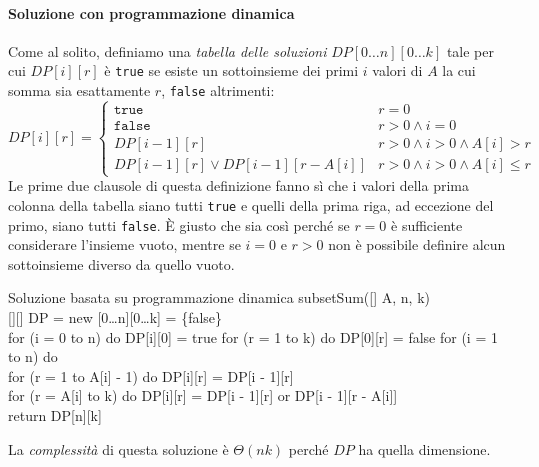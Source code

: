 \paragraph{Soluzione con programmazione dinamica}
Come al solito, definiamo una \emph{tabella delle soluzioni}
$DP[0\dots n][0\dots k]$ tale per cui $DP[i][r]$ è \texttt{true} se esiste un
sottoinsieme dei primi $i$ valori di $A$ la cui somma sia esattamente $r$,
\texttt{false} altrimenti:
\[DP[i][r]=\begin{cases}
    \texttt{true} & r=0\\
    \texttt{false} & r>0\wedge i=0\\
    DP[i-1][r] & r>0\wedge i>0\wedge A[i]>r\\
    DP[i-1][r]\vee DP[i-1][r-A[i]] & r>0\wedge i>0\wedge A[i]\leq r
\end{cases}\]
Le prime due clausole di questa definizione fanno sì che i valori della prima
colonna della tabella siano tutti \texttt{true} e quelli della prima riga, ad
eccezione del primo, siano tutti \texttt{false}. È giusto che sia così perché
se $r=0$ è sufficiente considerare l'insieme vuoto, mentre se $i=0$ e $r>0$
non è possibile definire alcun sottoinsieme diverso da quello vuoto.

\begin{minicode}{Soluzione basata su programmazione dinamica}
\ind{} subsetSum([] A,  n,  k)\\
    [][] DP = new [0\dots n][0\dots k] = \{false\}\\
    \indf for (i = 0 to n) do\hfill{}
        DP[i][0] = true\hfill{}
    \indf for (r = 1 to k) do\hfill{}
        DP[0][r] = false\hfill{}
    \indf for (i = 1 to n) do\\
        \indff for (r = 1 to A[i] - 1) do\hfill{}
            DP[i][r] = DP[i - 1][r]\\
        \indff for (r = A[i] to k) do\hfill{}
            DP[i][r] = DP[i - 1][r] or DP[i - 1][r - A[i]]\\
    \indf return DP[n][k]
\end{minicode}
\noindent
La \emph{complessità} di questa soluzione è $\Theta(nk)$ perché $DP$ ha quella
dimensione.

